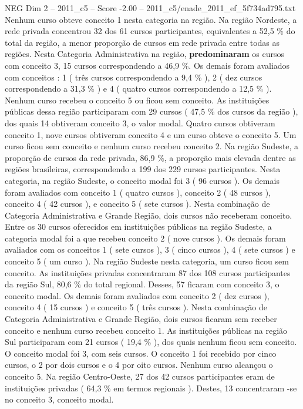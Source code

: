 \begin{textsample}{NEG Dim 2 – 2011\_c5 – Score -2.00 – 2011\_c5/enade\_2011\_ef\_5f734ad795.txt}
Nenhum curso obteve conceito 1 nesta categoria na região.
Na região Nordeste, a rede privada concentrou 32 dos 61 cursos participantes, equivalentes a 52,5 \% do total da região, a menor proporção de cursos em rede privada entre todas as regiões.
Nesta Categoria Administrativa na região, \textbf{predominaram} os cursos com conceito 3, 15 cursos correspondendo a 46,9 \%.
Os demais foram avaliados com conceitos : 1 ( três cursos correspondendo a 9,4 \% ), 2 ( dez cursos correspondendo a 31,3 \% ) e 4 ( quatro cursos correspondendo a 12,5 \% ).
Nenhum curso recebeu o conceito 5 ou ficou sem conceito.
As instituições públicas dessa região participaram com 29 cursos ( 47,5 \% dos cursos da região ), dos quais 14 obtiveram conceito 3, o valor modal.
Quatro cursos obtiveram conceito 1, nove cursos obtiveram conceito 4 e um curso obteve o conceito 5.
Um curso ficou sem conceito e nenhum curso recebeu conceito 2.
Na região Sudeste, a proporção de cursos da rede privada, 86,9 \%, a proporção mais elevada dentre as regiões brasileiras, correspondendo a 199 dos 229 cursos participantes.
Nesta categoria, na região Sudeste, o conceito modal foi 3 ( 96 cursos ).
Os demais foram avaliados com conceito 1 ( quatro cursos ), conceito 2 ( 48 cursos ), conceito 4 ( 42 cursos ), e conceito 5 ( sete cursos ).
Nesta combinação de Categoria Administrativa e Grande Região, dois cursos não receberam conceito.
Entre os 30 cursos oferecidos em instituições públicas na região Sudeste, a categoria modal foi a que recebeu conceito 2 ( nove cursos ).
Os demais foram avaliados com os conceitos 1 ( sete cursos ), 3 ( cinco cursos ), 4 ( sete cursos ) e conceito 5 ( um curso ).
Na região Sudeste nesta categoria, um curso ficou sem conceito.
As instituições privadas concentraram 87 dos 108 cursos participantes da região Sul, 80,6 \% do total regional.
Desses, 57 ficaram com conceito 3, o conceito modal.
Os demais foram avaliados com conceito 2 ( dez cursos ), conceito 4 ( 15 cursos ) e conceito 5 ( três cursos ).
Nesta combinação de Categoria Administrativa e Grande Região, dois cursos ficaram sem receber conceito e nenhum curso recebeu conceito 1.
As instituições públicas na região Sul participaram com 21 cursos ( 19,4 \% ), dos quais nenhum ficou sem conceito.
O conceito modal foi 3, com seis cursos.
O conceito 1 foi recebido por cinco cursos, o 2 por dois cursos e o 4 por oito cursos.
Nenhum curso alcançou o conceito 5.
Na região Centro-Oeste, 27 dos 42 cursos participantes eram de instituições privadas ( 64,3 \% em termos regionais ).
Destes, 13 concentraram -se no conceito 3, conceito modal.

\end{textsample}
